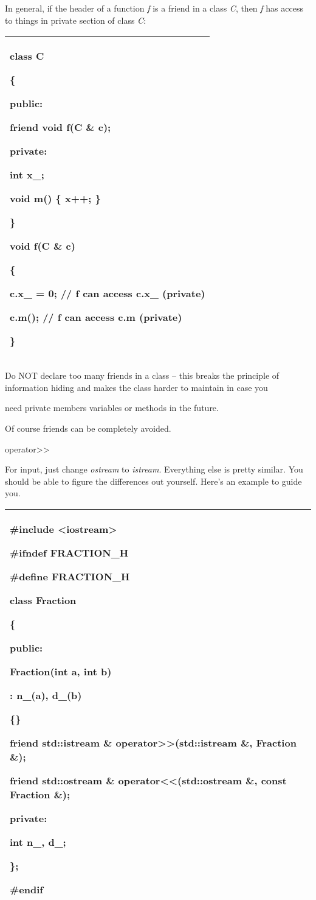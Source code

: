 \documentclass[
]{article}
\begin{document}
In general, if the header of a function \emph{f} is a friend in a class
\emph{C}, then \emph{f} has access to things in private section of class
\emph{C}:

\begin{longtable}[]{@{}l@{}}
\toprule
\endhead
\begin{minipage}[t]{0.97\columnwidth}\raggedright
class C

\{

public:

\textbf{friend void f(C \& c);}

private:

int x\_;

void m() \{ x++; \}

\}

void f(C \& c)

\{

c.x\_ = 0; // f can access c.x\_ (private)

c.m(); // f can access c.m (private)

\}\strut
\end{minipage}\tabularnewline
\bottomrule
\end{longtable}

Do NOT declare too many friends in a class -- this breaks the principle
of information hiding and makes the class harder to maintain in case you

need private members variables or methods in the future.

Of course friends can be completely avoided.

operator\textgreater\textgreater{}

For input, just change \emph{ostream} to \emph{istream}. Everything else
is pretty similar. You should be able to figure the differences out
yourself. Here's an example to guide you.

\begin{longtable}[]{@{}l@{}}
\toprule
\endhead
\begin{minipage}[t]{0.97\columnwidth}\raggedright
\#include \textless iostream\textgreater{}

\#ifndef FRACTION\_H

\#define FRACTION\_H

class Fraction

\{

public:

Fraction(int a, int b)

: n\_(a), d\_(b)

\{\}

friend std::istream \& operator\textgreater\textgreater(std::istream \&,
Fraction \&);

friend std::ostream \& operator\textless\textless(std::ostream \&, const
Fraction \&);

private:

int n\_, d\_;

\};

\#endif\strut
\end{minipage}\tabularnewline
\bottomrule
\end{longtable}
\end{document}
